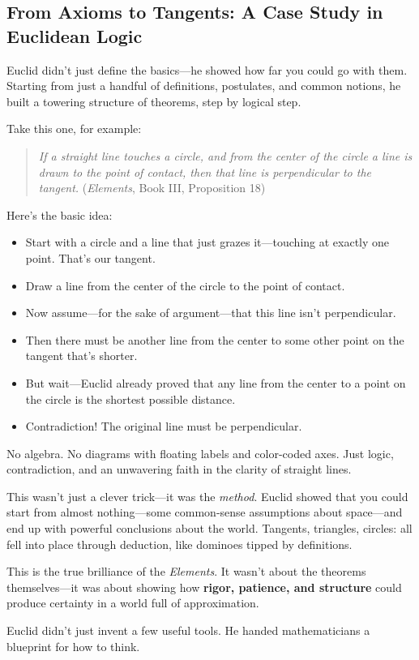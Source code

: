 \subsection{From Axioms to Tangents: A Case Study in Euclidean Logic}

Euclid didn’t just define the basics—he showed how far you could go with them. Starting from just a handful of definitions, postulates, and common notions, he built a towering structure of theorems, step by logical step.

Take this one, for example:

\begin{quote}
\textit{If a straight line touches a circle, and from the center of the circle a line is drawn to the point of contact, then that line is perpendicular to the tangent.} (\textit{Elements}, Book III, Proposition 18)
\end{quote}

Here's the basic idea:

\begin{itemize}
    \item Start with a circle and a line that just grazes it—touching at exactly one point. That’s our tangent.
    \item Draw a line from the center of the circle to the point of contact.
    \item Now assume—for the sake of argument—that this line isn’t perpendicular.
    \item Then there must be another line from the center to some other point on the tangent that’s shorter.
    \item But wait—Euclid already proved that any line from the center to a point on the circle is the shortest possible distance.
    \item Contradiction! The original line must be perpendicular.
\end{itemize}

No algebra. No diagrams with floating labels and color-coded axes. Just logic, contradiction, and an unwavering faith in the clarity of straight lines.

This wasn’t just a clever trick—it was the \textit{method}. Euclid showed that you could start from almost nothing—some common-sense assumptions about space—and end up with powerful conclusions about the world. Tangents, triangles, circles: all fell into place through deduction, like dominoes tipped by definitions.

\medskip

\noindent This is the true brilliance of the \textit{Elements}. It wasn’t about the theorems themselves—it was about showing how \textbf{rigor, patience, and structure} could produce certainty in a world full of approximation.

Euclid didn’t just invent a few useful tools. He handed mathematicians a blueprint for how to think.


